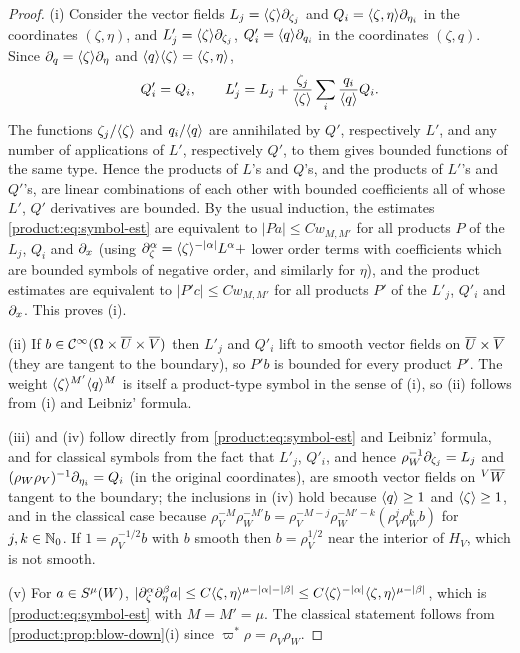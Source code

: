 \begin{proof}
(i) Consider the vector fields $L_j=\langle \zeta\rangle\partial_{\zeta_j}$ and
$Q_i=\langle \zeta,\eta\rangle\partial_{\eta_i}$ in the coordinates $(\zeta,\eta)$, and
$L'_j=\langle \zeta\rangle\partial_{\zeta_j}$, $Q'_i=\langle q\rangle\partial_{q_i}$ in the coordinates
$(\zeta,q)$. Since $\partial_q=\langle \zeta\rangle\partial_\eta$ and $\langle q\rangle\langle \zeta\rangle=\langle \zeta,\eta\rangle$,
\begin{equation*}
Q'_i=Q_i,\qquad L'_j=L_j+\frac{\zeta_j}{\langle \zeta\rangle}\sum_i\frac{q_i}{\langle q\rangle}Q_i.
\end{equation*}
The functions $\zeta_j/\langle \zeta\rangle$ and $q_i/\langle q\rangle$ are annihilated by $Q'$,
respectively $L'$, and any number of applications of $L'$, respectively $Q'$, to
them gives bounded functions of the same type. Hence the products of $L$'s and
$Q$'s, and the products of $L'$'s and $Q'$'s, are linear combinations of each
other with bounded coefficients all of whose $L'$, $Q'$ derivatives are bounded.
By the usual induction, the estimates \eqref{product:eq:symbol-est} are equivalent
to $|P a|\le Cw_{M,M'}$ for all products $P$ of the $L_j$, $Q_i$ and $\partial_x$
(using $\partial^\alpha_\zeta=\langle \zeta\rangle^{-|\alpha|}L^\alpha+$ lower order terms with
coefficients which are bounded symbols of negative order, and similarly for
$\eta$), and the product estimates are equivalent to $|P'c|\le Cw_{M,M'}$ for all
products $P'$ of the $L'_j$, $Q'_i$ and $\partial_x$. This proves (i).

(ii) If $b\in\mathcal{C}^\infty(\Omega\times\overline{U}\times\overline{V})$ then $L'_j$ and $Q'_i$ lift to
smooth vector fields on $\overline{U}\times\overline{V}$ (they are tangent to the boundary), so
$P'b$ is bounded for every product $P'$. The weight $\langle \zeta\rangle^{M'}\langle q\rangle^{M}$ is
itself a product-type symbol in the sense of (i), so (ii) follows from (i) and
Leibniz' formula.

(iii) and (iv) follow directly from \eqref{product:eq:symbol-est} and Leibniz'
formula, and for classical symbols from the fact that $L'_j$, $Q'_i$, and hence
$\rho_W^{-1}\partial_{\zeta_j}=L_j$ and $(\rho_W\rho_V)^{-1}\partial_{\eta_i}=Q_i$ (in the
original coordinates), are smooth vector fields on ${}^{V}\overline{W}$ tangent to the
boundary; the inclusions in (iv) hold because $\langle q\rangle\ge1$ and $\langle \zeta\rangle\ge1$,
and in the classical case because $\rho_V^{-M}\rho_W^{-M'}b=
\rho_V^{-M-j}\rho_W^{-M'-k}(\rho_V^j\rho_W^kb)$ for $j,k\in\mathbb{N}_0$. If
$1=\rho_V^{-1/2}b$ with $b$ smooth then $b=\rho_V^{1/2}$ near the interior of
$H_V$, which is not smooth.

(v) For $a\in S^{\mu}(W)$, $|\partial^\alpha_\zeta\partial^\beta_\eta a|\le
C\langle \zeta,\eta\rangle^{\mu-|\alpha|-|\beta|}\le C\langle \zeta\rangle^{-|\alpha|}
\langle \zeta,\eta\rangle^{\mu-|\beta|}$, which is \eqref{product:eq:symbol-est} with
$M=M'=\mu$. The classical statement follows from \cref{product:prop:blow-down}(i)
since $\varpi^*\rho=\rho_V\rho_W$.


\end{proof}
